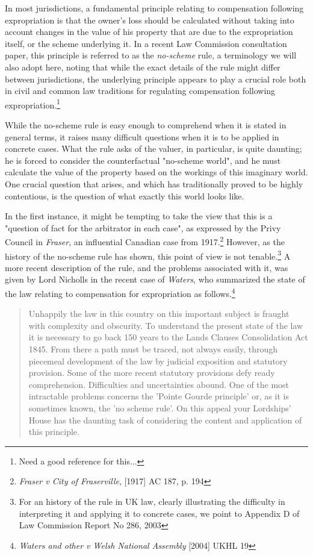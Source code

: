 In most jurisdictions, a fundamental principle relating to compensation following expropriation is that the owner's loss should be calculated without taking into account changes in the value of his property that are due to the expropriation itself, or the scheme underlying it. In a recent Law Commission consultation paper, this principle is referred to as the \emph{no-scheme} rule, a terminology we will also adopt here, noting that while the exact details of the rule might differ between jurisdictions, the underlying principle appears to play a crucial role both in civil and common law traditions for regulating compensation following expropriation.\footnote{Need a good reference for this...}

While the no-scheme rule is easy enough to comprehend when it is stated in general terms, it raises many difficult questions when it is to be applied in concrete cases. What the rule asks of the valuer, in particular, is quite daunting; he is forced to consider the counterfactual "no-scheme world", and he must calculate the value of the property based on the workings of this imaginary world. One crucial question that arises, and which has traditionally proved to be highly contentious, is the question of what exactly this world looks like.

In the first instance, it might be tempting to take the view that this is a "question of fact for the arbitrator in each case", as expressed by the Privy Council in \emph{Fraser}, an influential Canadian case from 1917.\footnote{\emph{Fraser v City of Fraserville}, [1917] AC 187, p. 194} However, as the history of the no-scheme rule has shown, this point of view is not tenable.\footnote{For an history of the rule in UK law, clearly illustrating the difficulty in interpreting it and applying it to concrete cases, we point to Appendix D of Law Commission Report No 286, 2003} A more recent description of the rule, and the problems associated with it, was given by Lord Nicholls in the recent case of \emph{Waters}, who summarized the state of the law relating to compensation for expropriation as follows.\footnote{\emph{Waters and other v Welsh National Assembly} [2004] UKHL 19}

\begin{quote}
Unhappily the law in this country on this important subject is fraught with complexity and obscurity. To understand the present state of the law it is necessary to go back 150 years to the Lands Clauses Consolidation Act 1845. From there a path must be traced, not always easily, through piecemeal development of the law by judicial exposition and statutory provision. Some of the more recent statutory provisions defy ready comprehension. Difficulties and uncertainties abound. One of the most intractable problems concerns the 'Pointe Gourde principle' or, as it is sometimes known, the 'no scheme rule'. On this appeal your Lordships' House has the daunting task of considering the content and application of this principle.
\end{quote}

